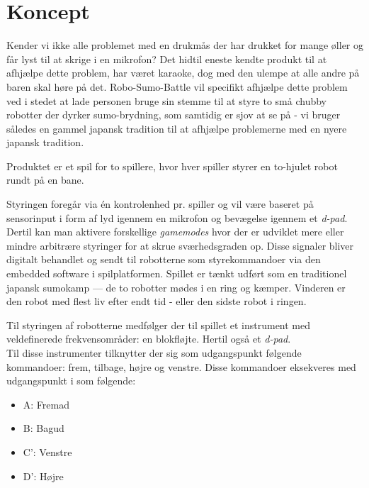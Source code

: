 \section{Koncept}
 Kender vi ikke alle problemet med en drukmås der har drukket for mange øller og får lyst til at skrige i en mikrofon? Det hidtil eneste kendte produkt til at afhjælpe dette problem, har været karaoke, dog med den ulempe at alle andre på baren skal høre på det. Robo-Sumo-Battle vil specifikt afhjælpe dette problem ved i stedet at lade personen bruge sin stemme til at styre to små chubby robotter der dyrker sumo-brydning, som samtidig er sjov at se på - vi bruger således en gammel japansk tradition til at afhjælpe problemerne med en nyere japansk tradition. 

Produktet er et spil for to spillere, hvor hver spiller styrer en to-hjulet robot rundt på en bane.

Styringen foregår via én kontrolenhed pr. spiller og vil være baseret på sensorinput i form af lyd igennem en mikrofon og bevægelse igennem et \textit{d-pad}. Dertil kan man aktivere forskellige \textit{gamemodes} hvor der er udviklet mere eller mindre arbitrære styringer for at skrue sværhedsgraden op. 
Disse signaler bliver digitalt behandlet og sendt til robotterne som styrekommandoer via den embedded software i spilplatformen.
Spillet er tænkt udført som en traditionel japansk sumokamp --- de to robotter mødes i en ring og kæmper. Vinderen er den robot med flest liv efter endt tid - eller den sidste robot i ringen.



Til styringen af robotterne medfølger der til spillet et instrument med veldefinerede frekvensområder: en blokfløjte. Hertil også et \textit{d-pad}.
\\
 Til disse instrumenter tilknytter der sig som udgangspunkt følgende kommandoer: frem, tilbage, højre og venstre. Disse kommandoer eksekveres med udgangspunkt i  som følgende: 
\begin{itemize}
    \item A: Fremad
    \item B: Bagud
    \item C': Venstre 
    \item D': Højre
\end{itemize}




